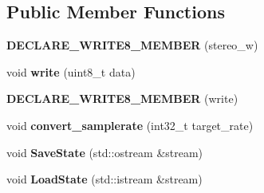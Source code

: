 \subsection*{Public Member Functions}
\begin{DoxyCompactItemize}
\item 
\hypertarget{classsn76496__base__device_a9995cec5d0bbba38a61ee8ea2052c6ca}{{\bfseries D\-E\-C\-L\-A\-R\-E\-\_\-\-W\-R\-I\-T\-E8\-\_\-\-M\-E\-M\-B\-E\-R} (stereo\-\_\-w)}\label{classsn76496__base__device_a9995cec5d0bbba38a61ee8ea2052c6ca}

\item 
\hypertarget{classsn76496__base__device_a985ce1f5b9f10c590a77c4a780ee4a56}{void {\bfseries write} (uint8\-\_\-t data)}\label{classsn76496__base__device_a985ce1f5b9f10c590a77c4a780ee4a56}

\item 
\hypertarget{classsn76496__base__device_a07176d7f7d97414f4ade5961fc510274}{{\bfseries D\-E\-C\-L\-A\-R\-E\-\_\-\-W\-R\-I\-T\-E8\-\_\-\-M\-E\-M\-B\-E\-R} (write)}\label{classsn76496__base__device_a07176d7f7d97414f4ade5961fc510274}

\item 
\hypertarget{classsn76496__base__device_ab023c6361d344a21bb4bd7e0bd9616e8}{void {\bfseries convert\-\_\-samplerate} (int32\-\_\-t target\-\_\-rate)}\label{classsn76496__base__device_ab023c6361d344a21bb4bd7e0bd9616e8}

\item 
\hypertarget{classsn76496__base__device_a7fdf319e54b7e18edbb2ec8cea19e958}{void {\bfseries Save\-State} (std\-::ostream \&stream)}\label{classsn76496__base__device_a7fdf319e54b7e18edbb2ec8cea19e958}

\item 
\hypertarget{classsn76496__base__device_a5d755d791693db133395694a0d8cc340}{void {\bfseries Load\-State} (std\-::istream \&stream)}\label{classsn76496__base__device_a5d755d791693db133395694a0d8cc340}

\end{DoxyCompactItemize}
